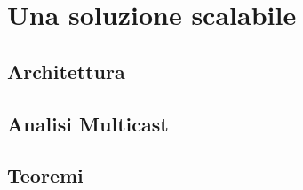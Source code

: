 \chapter{Una soluzione scalabile}

\section{Architettura}

\section{Analisi Multicast}

\section{Teoremi}